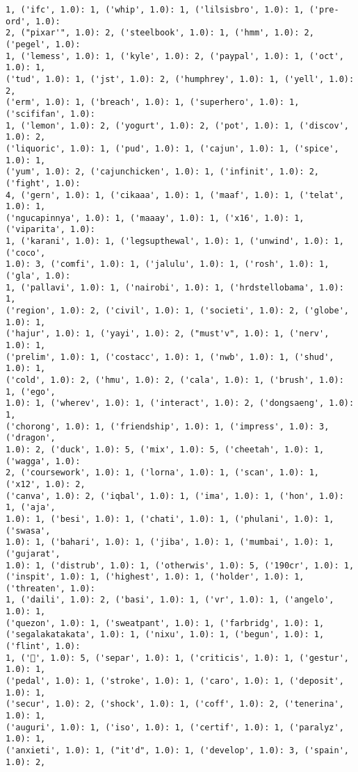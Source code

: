\documentclass[11pt]{article}
\begin{document}
\begin{Verbatim}[commandchars=\\\{\}]
1, ('ifc', 1.0): 1, ('whip', 1.0): 1, ('lilsisbro', 1.0): 1, ('pre-ord', 1.0):
2, ("pixar'", 1.0): 2, ('steelbook', 1.0): 1, ('hmm', 1.0): 2, ('pegel', 1.0):
1, ('lemess', 1.0): 1, ('kyle', 1.0): 2, ('paypal', 1.0): 1, ('oct', 1.0): 1,
('tud', 1.0): 1, ('jst', 1.0): 2, ('humphrey', 1.0): 1, ('yell', 1.0): 2,
('erm', 1.0): 1, ('breach', 1.0): 1, ('superhero', 1.0): 1, ('scififan', 1.0):
1, ('lemon', 1.0): 2, ('yogurt', 1.0): 2, ('pot', 1.0): 1, ('discov', 1.0): 2,
('liquoric', 1.0): 1, ('pud', 1.0): 1, ('cajun', 1.0): 1, ('spice', 1.0): 1,
('yum', 1.0): 2, ('cajunchicken', 1.0): 1, ('infinit', 1.0): 2, ('fight', 1.0):
4, ('gern', 1.0): 1, ('cikaaa', 1.0): 1, ('maaf', 1.0): 1, ('telat', 1.0): 1,
('ngucapinnya', 1.0): 1, ('maaay', 1.0): 1, ('x16', 1.0): 1, ('viparita', 1.0):
1, ('karani', 1.0): 1, ('legsupthewal', 1.0): 1, ('unwind', 1.0): 1, ('coco',
1.0): 3, ('comfi', 1.0): 1, ('jalulu', 1.0): 1, ('rosh', 1.0): 1, ('gla', 1.0):
1, ('pallavi', 1.0): 1, ('nairobi', 1.0): 1, ('hrdstellobama', 1.0): 1,
('region', 1.0): 2, ('civil', 1.0): 1, ('societi', 1.0): 2, ('globe', 1.0): 1,
('hajur', 1.0): 1, ('yayi', 1.0): 2, ("must'v", 1.0): 1, ('nerv', 1.0): 1,
('prelim', 1.0): 1, ('costacc', 1.0): 1, ('nwb', 1.0): 1, ('shud', 1.0): 1,
('cold', 1.0): 2, ('hmu', 1.0): 2, ('cala', 1.0): 1, ('brush', 1.0): 1, ('ego',
1.0): 1, ('wherev', 1.0): 1, ('interact', 1.0): 2, ('dongsaeng', 1.0): 1,
('chorong', 1.0): 1, ('friendship', 1.0): 1, ('impress', 1.0): 3, ('dragon',
1.0): 2, ('duck', 1.0): 5, ('mix', 1.0): 5, ('cheetah', 1.0): 1, ('wagga', 1.0):
2, ('coursework', 1.0): 1, ('lorna', 1.0): 1, ('scan', 1.0): 1, ('x12', 1.0): 2,
('canva', 1.0): 2, ('iqbal', 1.0): 1, ('ima', 1.0): 1, ('hon', 1.0): 1, ('aja',
1.0): 1, ('besi', 1.0): 1, ('chati', 1.0): 1, ('phulani', 1.0): 1, ('swasa',
1.0): 1, ('bahari', 1.0): 1, ('jiba', 1.0): 1, ('mumbai', 1.0): 1, ('gujarat',
1.0): 1, ('distrub', 1.0): 1, ('otherwis', 1.0): 5, ('190cr', 1.0): 1,
('inspit', 1.0): 1, ('highest', 1.0): 1, ('holder', 1.0): 1, ('threaten', 1.0):
1, ('daili', 1.0): 2, ('basi', 1.0): 1, ('vr', 1.0): 1, ('angelo', 1.0): 1,
('quezon', 1.0): 1, ('sweatpant', 1.0): 1, ('farbridg', 1.0): 1,
('segalakatakata', 1.0): 1, ('nixu', 1.0): 1, ('begun', 1.0): 1, ('flint', 1.0):
1, ('🍰', 1.0): 5, ('separ', 1.0): 1, ('criticis', 1.0): 1, ('gestur', 1.0): 1,
('pedal', 1.0): 1, ('stroke', 1.0): 1, ('caro', 1.0): 1, ('deposit', 1.0): 1,
('secur', 1.0): 2, ('shock', 1.0): 1, ('coff', 1.0): 2, ('tenerina', 1.0): 1,
('auguri', 1.0): 1, ('iso', 1.0): 1, ('certif', 1.0): 1, ('paralyz', 1.0): 1,
('anxieti', 1.0): 1, ("it'd", 1.0): 1, ('develop', 1.0): 3, ('spain', 1.0): 2,

\end{Verbatim}
\end{document}

